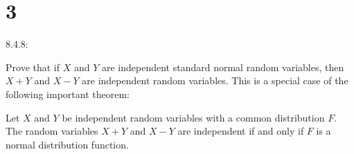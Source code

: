 \documentclass{article}
\begin{document}
\section*{3}
\begin{ques}\label{q3}
    8.4.8:

    Prove that if $X$ and $Y$ are independent standard normal random variables, then $X+Y$ and $X-Y$ are independent random variables. This is a special case of the following important theorem:
    \begin{thm}
        Let $X$ and $Y$ be independent random variables with a common distribution $F$. The random variables $X+Y$ and $X-Y$ are independent if and only if $F$ is a normal distribution function.
    \end{thm}
\end{ques}
\end{document}
